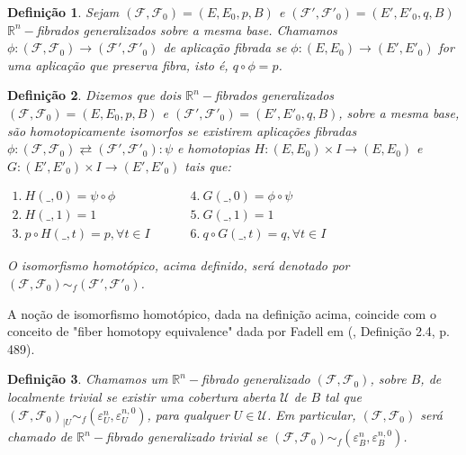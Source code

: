 \documentclass[12pt,oneside]{book} %
\newtheorem{defi}   {\hspace{0.5cm}Defini\c c\~ao}[chapter]
\newcommand{\R}{\mathbb{R}}
\begin{document}
\begin{defi}
	Sejam $(\mathcal{F},\mathcal{F}_{0})=(E,E_{0},p,B)$ e $(\mathcal{F'},\mathcal{F'}_{0})=(E',E'_{0},q,B)$ $\R^{n}-$fibrados generalizados sobre a mesma base. Chamamos $\phi:(\mathcal{F},\mathcal{F}_{0})\to (\mathcal{F'},\mathcal{F'}_{0})$ de aplicação fibrada se $\phi:(E,E_{0})\to (E',E'_{0})$ for uma aplicação que preserva fibra, isto é, $q\circ\phi=p$.
\end{defi}

\begin{defi}\label{defi_iso_homot}
	Dizemos que dois $\R^{n}-$fibrados generalizados $(\mathcal{F},\mathcal{F}_{0})=(E,E_{0},p,B)$ e $(\mathcal{F'},\mathcal{F'}_{0})=(E',E'_{0},q,B)$, sobre a mesma base, são homotopicamente isomorfos se existirem aplicações fibradas $\phi:(\mathcal{F},\mathcal{F}_{0})\rightleftarrows (\mathcal{F'},\mathcal{F'}_{0}):\psi$ e homotopias $H:(E,E_{0})\times I\to (E,E_{0})$ e $G:(E',E'_{0})\times I\to (E',E'_{0})$ tais que: \newline
	
	$\begin{array}{lcccl}
		1. \ H(\_,0)=\psi\circ\phi            & & & & 4. \ G(\_,0)=\phi\circ\psi \\
		2. \ H(\_,1)=1                        & & & & 5. \ G(\_,1)=1 \\
		3. \ p\circ H(\_,t)=p, \forall t\in I & & & & 6. \ q\circ G(\_,t)=q, \forall t\in I
	\end{array}$ \newline
	
	\par O isomorfismo homotópico, acima definido, será denotado por $(\mathcal{F},\mathcal{F}_{0})\sim_{f} (\mathcal{F'},\mathcal{F'}_{0})$.
\end{defi}

\par A noção de isomorfismo homotópico, dada na definição acima, coincide com o conceito de "fiber homotopy equivalence" dada por Fadell em (\cite{fadell_1}, Definição 2.4, p. 489).

\begin{defi}
	Chamamos um $\R^{n}-$fibrado generalizado $(\mathcal{F},\mathcal{F}_{0})$, sobre $B$, de localmente trivial se existir uma cobertura aberta $\mathcal{U}$ de $B$ tal que $(\mathcal{F},\mathcal{F}_{0})_{|U}\sim_{f} (\varepsilon^{n}_{U},\varepsilon^{n,0}_{U})$, para qualquer $U\in\mathcal{U}$. Em particular, $(\mathcal{F},\mathcal{F}_{0})$ será chamado de $\R^{n}-$fibrado generalizado trivial se $(\mathcal{F},\mathcal{F}_{0})\sim_{f} (\varepsilon^{n}_{B},\varepsilon^{n,0}_{B})$.
\end{defi}
\end{document}
